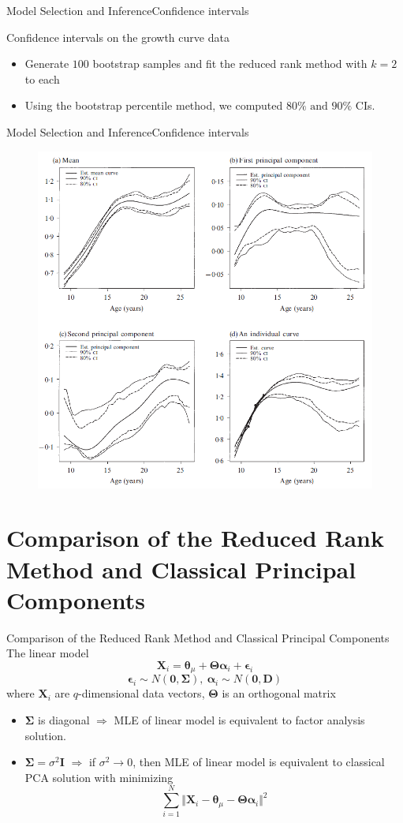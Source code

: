 \documentclass{beamer}
\def \bX {\mathbf{X}}
\def \btheta {\boldsymbol{\theta}}
\def \bTheta {\boldsymbol{\Theta}}
\def \bepsilon {\boldsymbol{\epsilon}}
\def \balpha {\boldsymbol{\alpha}}
\begin{document}
\begin{frame}{Model Selection and Inference}{Confidence intervals}
	\begin{block}{Confidence intervals on the growth curve data}
		\begin{itemize}
			\item {
				Generate $100$ bootstrap samples and fit the reduced rank method with $k=2$ to each
			}
			\item {
				Using the bootstrap percentile method, we computed $80\% \text{ and } 90\%$ CIs.
			}
		\end{itemize}
	\end{block}
\end{frame}

\begin{frame}{Model Selection and Inference}{Confidence intervals}
	\begin{figure}[h] %
		\begin{center}
			\includegraphics[width=0.6\linewidth]{img/10.png}
		\end{center}
		\label{fig:long}
		\label{fig:onecol}
	\end{figure}
\end{frame}


\section{Comparison of the Reduced Rank Method and Classical Principal Components}
\begin{frame}{Comparison of the Reduced Rank Method and Classical Principal Components}
	The linear model
	$$ \bX_i = \btheta_{\mu}+\bTheta\balpha_i + \bepsilon_i $$
	$$ \bepsilon_i \sim N(\mathbf{0}, \mathbf{\Sigma}), \ \balpha_i \sim N(\mathbf{0},\mathbf{D}) $$
	where $\bX_i$ are $q$-dimensional data vectors, $\bTheta$ is an orthogonal matrix
	\begin{itemize}
		\item {
			$\mathbf{\Sigma}$ is diagonal $\Rightarrow$ MLE of linear model is equivalent to factor analysis solution.
		}
		\item {
			$\mathbf{\Sigma}=\sigma^2 \mathbf{I}$ $\Rightarrow$ if $\sigma^2 \rightarrow 0$, then MLE of linear model is equivalent to classical PCA solution with minimizing
			$$ \sum_{i=1}^N \Vert \bX_i - \btheta_{\mu}-\bTheta\balpha_i \Vert^2  $$
		}
	\end{itemize}
\end{frame}
\end{document}
